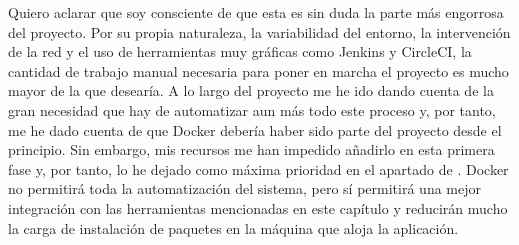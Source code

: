Quiero aclarar que soy consciente de que esta es sin duda la parte más engorrosa del proyecto. Por su propia naturaleza, la variabilidad del entorno, la intervención de la red y el uso de herramientas muy gráficas como Jenkins y CircleCI, la cantidad de trabajo manual necesaria para poner en marcha el proyecto es mucho mayor de la que desearía. A lo largo del proyecto me he ido dando cuenta de la gran necesidad que hay de automatizar aun más todo este proceso y, por tanto, me he dado cuenta de que Docker debería haber sido parte del proyecto desde el principio. Sin embargo, mis recursos me han impedido añadirlo en esta primera fase y, por tanto, lo he dejado como máxima prioridad en el apartado de . Docker no permitirá toda la automatización del sistema, pero sí permitirá una mejor integración con las herramientas mencionadas en este capítulo y reducirán mucho la carga de instalación de paquetes en la máquina que aloja la aplicación.
